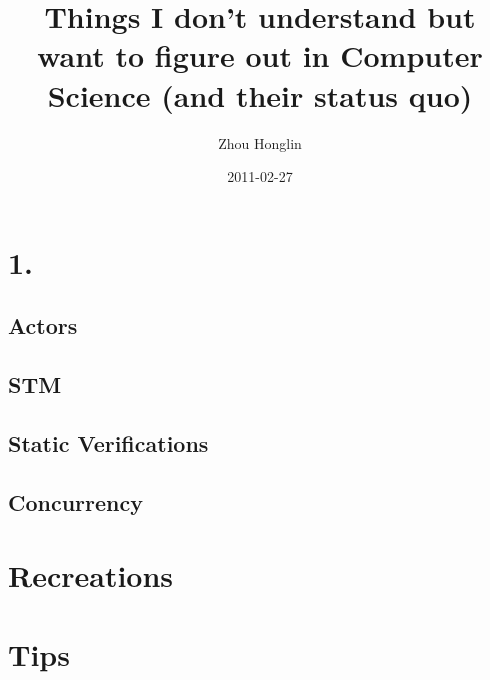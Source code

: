 \documentclass[11pt,letterpaper,twoside,openright]{book}
\title{Things I don't understand but want to figure out in Computer Science (and their status quo)}
\author{Zhou Honglin}
\date{2011-02-27}
\begin{document}
\maketitle

\chapter{1.}
\section{Actors}
\section{STM}
\section{Static Verifications}
\section{Concurrency}

\chapter[Or should I call it this way?]{Recreations}


\chapter[Or things iI fixed?]{Tips}
\end{document}
